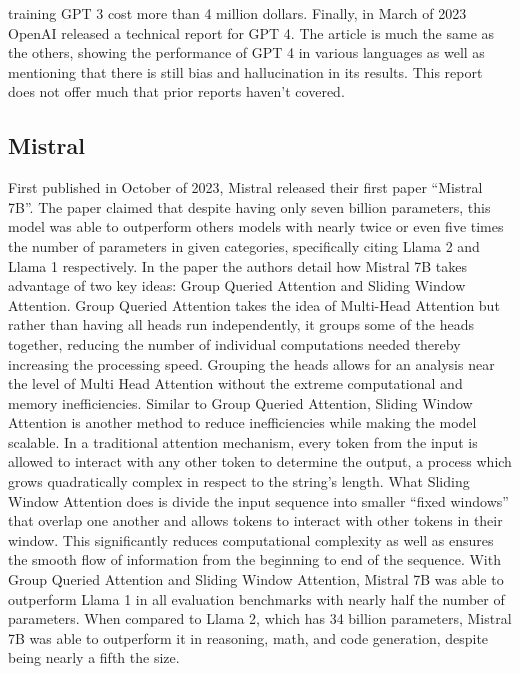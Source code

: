 \documentclass[10pt,twocolumn]{article}
\begin{document}
training GPT 3 cost more than 4 million dollars\cite{leswing_chatgpt_2023}. Finally, in March of 2023 OpenAI released a technical report for GPT 4. The article is much the same as the others, showing the performance of GPT 4 in various languages as well as mentioning that there is still bias and hallucination in its results. This report does not offer much that prior reports haven't covered. 

\subsection{Mistral}
First published in October of 2023, Mistral released their first paper “Mistral 7B”\cite{gathnex_mistral-7b_2023}. The paper claimed that despite having only seven billion parameters, this model was able to outperform others models with nearly twice or even five times the number of parameters in given categories, specifically citing Llama 2 and Llama 1 respectively. In the paper the authors detail how Mistral 7B takes advantage of two key ideas: Group Queried Attention\cite{noauthor_number_2023} and Sliding Window Attention\cite{noauthor_papers_nodate-1}. Group Queried Attention takes the idea of Multi-Head Attention but rather than having all heads run independently, it groups some of the heads together, reducing the number of individual computations needed thereby increasing the processing speed. Grouping the heads allows for an analysis near the level of Multi Head Attention without the extreme computational and memory inefficiencies. Similar to Group Queried Attention, Sliding Window Attention is another method to reduce inefficiencies while making the model scalable. In a traditional attention mechanism, every token from the input is allowed to interact with any other token to determine the output, a process which grows quadratically complex in respect to the string’s length. What Sliding Window Attention does is divide the input sequence into smaller “fixed windows” that overlap one another and allows tokens to interact with other tokens in their window. This significantly reduces computational complexity as well as ensures the smooth flow of information from the beginning to end of the sequence. With Group Queried Attention and Sliding Window Attention, Mistral 7B was able to outperform Llama 1 in all evaluation benchmarks with nearly half the number of parameters. When compared to Llama 2, which has 34 billion parameters, Mistral 7B was able to outperform it in reasoning, math, and code generation, despite being nearly a fifth the size.  
\end{document}
